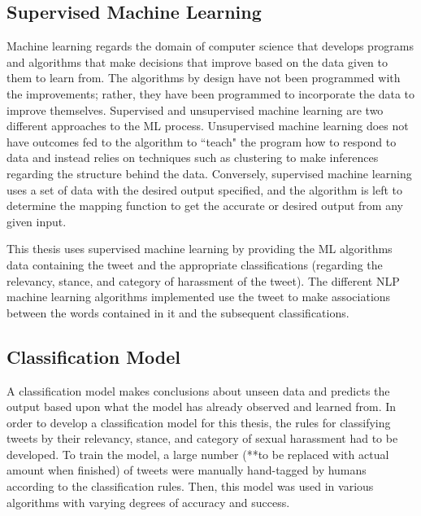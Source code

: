\subsection{Supervised Machine Learning}

Machine learning regards the domain of computer science that develops programs and algorithms that make decisions that improve based on the data given to them to learn from. The algorithms by design have not been programmed with the improvements; rather, they have been programmed to incorporate the data to improve themselves.
Supervised and unsupervised machine learning are two different approaches to the ML process. Unsupervised machine learning does not have outcomes fed to the algorithm to ``teach" the program how to respond to data and instead relies on techniques such as clustering to make inferences regarding the structure behind the data. Conversely, supervised machine learning uses a set of data with the desired output specified, and the algorithm is left to determine the mapping function to get the accurate or desired output from any given input.

This thesis uses supervised machine learning by providing the ML algorithms data containing the tweet and the appropriate classifications (regarding the relevancy, stance, and category of harassment of the tweet). The different NLP machine learning algorithms implemented use the tweet to make associations between the words contained in it and the subsequent classifications.

\subsection{Classification Model}

A classification model makes conclusions about unseen data and predicts the output based upon what the model has already observed and learned from. In order to develop a classification model for this thesis, the rules for classifying tweets by their relevancy, stance, and category of sexual harassment had to be developed. To train the model, a large number (**to be replaced with actual amount when finished) of tweets were manually hand-tagged by humans according to the classification rules. Then, this model was used in various algorithms with varying degrees of accuracy and success.
